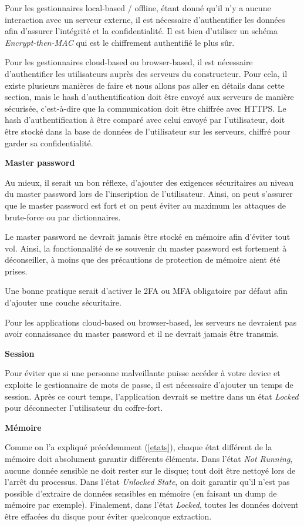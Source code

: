 Pour les gestionnaires local-based / offline, étant donné qu'il n'y a aucune interaction avec un serveur externe, il est nécessaire d'authentifier les données afin d'assurer l'intégrité et la confidentialité. Il est bien d'utiliser un schéma \textit{Encrypt-then-MAC} qui est le chiffrement authentifié le plus sûr. 

Pour les gestionnaires cloud-based ou browser-based, il est nécessaire d'authentifier les utilisateurs auprès des serveurs du constructeur. Pour cela, il existe plusieurs manières de faire et nous allons pas aller en détails dans cette section, mais le hash d'authentification doit être envoyé aux serveurs de manière sécurisée, c'est-à-dire que la communication doit être chiffrée avec HTTPS. Le hash d'authentification à être comparé avec celui envoyé par l'utilisateur, doit être stocké dans la base de données de l'utilisateur sur les serveurs, chiffré pour garder sa confidentialité. 

\textbf{Master password}

Au mieux, il serait un bon réflexe, d'ajouter des exigences sécuritaires au niveau du master password lors de l'inscription de l'utilisateur. Ainsi, on peut s'assurer que le master password est fort et on peut éviter au maximum les attaques de brute-force ou par dictionnaires.

Le master password ne devrait jamais être stocké en mémoire afin d'éviter tout vol. Ainsi, la fonctionnalité de se souvenir du master password est fortement à déconseiller, à moins que des précautions de protection de mémoire aient été prises. 

Une bonne pratique serait d'activer le 2FA ou MFA obligatoire par défaut afin d'ajouter une couche sécuritaire. 

Pour les applications cloud-based ou browser-based, les serveurs ne devraient pas avoir connaissance du master password et il ne devrait jamais être transmis. 

\textbf{Session}

Pour éviter que si une personne malveillante puisse accéder à votre device et exploite le gestionnaire de mots de passe, il est nécessaire d'ajouter un temps de session. Après ce court temps, l'application devrait se mettre dans un état \textit{Locked} pour déconnecter l'utilisateur du coffre-fort.

\textbf{Mémoire}

Comme on l'a expliqué précédemment (\ref{etats}), chaque état différent de la mémoire doit absolument garantir différents éléments. Dans l'état \textit{Not Running}, aucune donnée sensible ne doit rester sur le disque; tout doit être nettoyé lors de l'arrêt du processus. Dans l'état \textit{Unlocked State}, on doit garantir qu'il n'est pas possible d'extraire de données sensibles en mémoire (en faisant un dump de mémoire par exemple). Finalement, dans l'état \textit{Locked}, toutes les données doivent être effacées du disque pour éviter quelconque extraction. 

